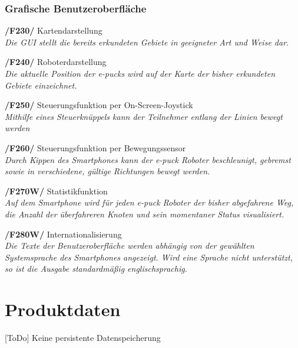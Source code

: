 \documentclass[10pt,a4paper]{article}
\begin{document}
			\subsubsection{Grafische Benutzeroberfläche}
				\begin{list}{}{\leftmargin=1cm}
					\item[\textbf{/F230/}] Kartendarstellung
						\\ \textsl{Die GUI stellt die bereits erkundeten Gebiete in geeigneter Art und Weise dar.}	
					\item[\textbf{/F240/}] Roboterdarstellung
						\\ \textsl{Die aktuelle Position der e-pucks wird auf der Karte der bisher erkundeten Gebiete
							einzeichnet.}	
					\item[\textbf{/F250/}] Steuerungsfunktion per On-Screen-Joystick
						\\ \textsl{Mithilfe eines Steuerknüppels kann der Teilnehmer entlang der Linien bewegt werden}
					\item[\textbf{/F260/}] Steuerungsfunktion per Bewegungssensor	
						\\ \textsl{Durch Kippen des Smartphones kann der e-puck Roboter beschleunigt, gebremst sowie in verschiedene, gültige
							Richtungen bewegt werden.}
					\item[\textbf{/F270W/}] Statistikfunktion	
						\\ \textsl{Auf dem Smartphone wird für jeden e-puck Roboter der bisher abgefahrene Weg, die Anzahl der überfahreren
							Knoten und sein momentaner Status visualisiert.}							
					\item[\textbf{/F280W/}] Internationalisierung	
						\\ \textsl{Die Texte der Benutzeroberfläche werden abhängig von der gewählten Systemsprache des Smartphones
							angezeigt. Wird eine Sprache nicht unterstützt, so ist die Ausgabe standardmäßig englischsprachig.}
				\end{list}
				
	\section{Produktdaten}
		[ToDo] Keine persistente Datenspeicherung
		
\end{document}
